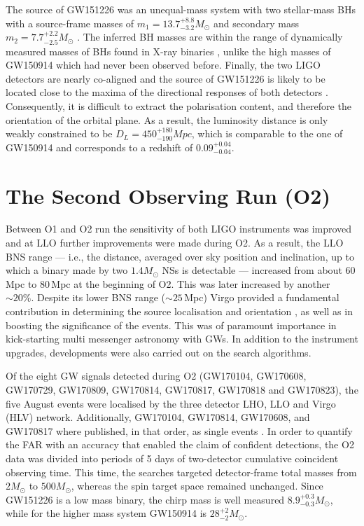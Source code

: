 \documentclass[binding=0.6cm, LaM]{sapthesis}
\begin{document}
	The source of GW151226 was an unequal-mass system with two stellar-mass BHs 
	with a source-frame masses of $m_1 = 13.7^{+8.8}_{-3.2}M_\odot$ 
	and secondary mass $m_2 = 7.7^{+2.2}_{-2.5}M_\odot$ \cite{13}. 
	The inferred BH masses are within the range of dynamically measured masses 
	of BHs found in X-ray binaries \cite{128, 129, 130, 132}, 
	unlike the high masses of GW150914 which had never been observed before. 
	Finally, the two LIGO detectors are nearly co-aligned and the source of GW151226 
	is likely to be located close to the maxima of the directional responses of both detectors \cite{28}. 
	Consequently, it is difficult to extract the polarisation content, and therefore the orientation of the orbital plane. 
	As a result, the luminosity distance is only weakly constrained to be $D_L = 450^{+180}_{-190}Mpc$, 
	which is comparable to the one of GW150914 and corresponds to a redshift of $0.09^{+0.04}_{-0.04}$.


\section{The Second Observing Run (O2)}
	Between O1 and O2 run the sensitivity of both LIGO instruments was improved and 
	at LLO further improvements were made during O2. 
	As a result, the LLO BNS range --- i.e., the distance, averaged over sky position and inclination, 
	up to which a binary made by two $1.4M_\odot$ NSs is detectable --- 
	increased from about 60\,Mpc to 80\,Mpc at the beginning of O2.  
	This was later increased by another $\sim 20\%$.
 	Despite its lower BNS range ($\sim 25\,$Mpc) Virgo provided a fundamental contribution 
	in determining the source localisation and orientation \cite{56}, 
	as well as in boosting the significance of the events. 
	This was of paramount importance in kick-starting multi messenger astronomy with GWs.
	In addition to the instrument upgrades, developments were also carried out on
	the search algorithms.
 
	Of the eight GW signals detected during O2 
	(GW170104, GW170608, GW170729, GW170809, GW170814, GW170817, GW170818 and GW170823), 
	the five August events were localised by the three detector LHO, LLO and Virgo (HLV) network.  
	Additionally, GW170104, GW170814, GW170608, and GW170817 where published, 
	in that order, as single events \cite{60,61,62,138}.   
	In order to quantify the FAR with an accuracy that enabled the claim of confident detections, 
	the O2 data was divided into periods of 5 days of two-detector cumulative coincident observing time.
	This time, the searches targeted  detector-frame total masses from $2M_\odot$ to $500 M_\odot$, 
	whereas the spin target space remained unchanged.
	Since GW151226 is a low mass binary, the chirp  mass is well measured $8.9^{+0.3}_{-0.3} M_\odot$,
	while for the higher mass system GW150914 is $28^{+2}_{-2}M_\odot$.
\end{document}
